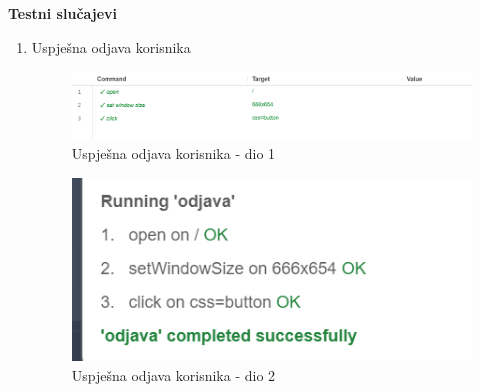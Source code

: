 			\textbf{Testni slučajevi}
			\begin{enumerate}
				\item Uspješna odjava korisnika\newline
				\begin{figure}[H]
					\includegraphics[scale=0.40]{slike/deploy/fTest2a.png}
					\centering
					\caption{Uspješna odjava korisnika - dio 1}
					\label{fig:fTest2a}
				\end{figure}
				\begin{figure}[H]
					\includegraphics[scale=0.40]{slike/deploy/fTest2b.png}
					\centering
					\caption{Uspješna odjava korisnika - dio 2}
					\label{fig:fTest2b}
				\end{figure}
			\end{enumerate}
			
